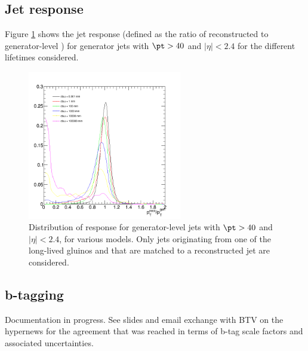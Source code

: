 \subsection{Jet response}
\label{app:LLP-jetresponse}

Figure \ref{fig:T1qqqq:response} shows the jet response (defined as the ratio
of reconstructed \pt to generator-level \pt) for generator jets with $\pt>40$ and 
$|\eta|<2.4$ for the different lifetimes considered.

\begin{figure}
    \begin{center}
    \includegraphics[width=0.6\textwidth]{figures/LLPResults/T1qqqqLL_response}
    \caption{Distribution of response for generator-level jets with $\pt>40$ and $|\eta|<2.4$,
        for various \ctau models. Only jets originating from one of the long-lived gluinos
        and that are matched to a reconstructed jet are considered.}
    \label{fig:T1qqqq:response}
    \end{center}
\end{figure}

\subsection{b-tagging}
\label{app:LLP-btagging}

Documentation in progress. See slides and email exchange with BTV on the
hypernews for the agreement that was reached in terms of b-tag scale factors 
and associated uncertainties.

